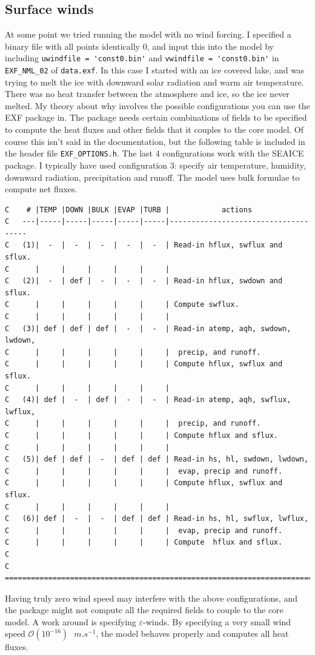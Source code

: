 \documentclass[11pt]{article}
\begin{document}
\subsection{Surface winds}
\label{sec:epsilonWinds}
At some point we tried running the model with no wind forcing. I specified a binary file with all points identically 0, and input this into the model by including \verb|uwindfile = 'const0.bin'| and \verb|vwindfile = 'const0.bin'| in \verb|EXF_NML_02| of \verb|data.exf|. In this case I started with an ice covered lake, and was trying to melt the ice with downward solar radiation and warm air temperature. There was no heat transfer between the atmosphere and ice, so the ice never melted. My theory about why involves the possible configurations you can use the EXF package in. The package needs certain combinations of fields to be specified to compute the heat fluxes and other fields that it couples to the core model. Of course this isn't said in the documentation, but the following table is included in the header file \verb|EXF_OPTIONS.h|. The last 4 configurations work with the SEAICE package. I typically have used configuration 3: specify air temperature, humidity, downward radiation, precipitation and runoff. The model uses bulk formulae to compute net fluxes.

\begin{lstlisting}[caption={Available configurations for running the EXF package}]
C    # |TEMP |DOWN |BULK |EVAP |TURB |            actions
C   ---|-----|-----|-----|-----|-----|-------------------------------------
C   (1)|  -  |  -  |  -  |  -  |  -  | Read-in hflux, swflux and sflux.
C      |     |     |     |     |     |
C   (2)|  -  | def |  -  |  -  |  -  | Read-in hflux, swdown and sflux.
C      |     |     |     |     |     | Compute swflux.
C      |     |     |     |     |     |
C   (3)| def | def | def |  -  |  -  | Read-in atemp, aqh, swdown, lwdown,
C      |     |     |     |     |     |  precip, and runoff.
C      |     |     |     |     |     | Compute hflux, swflux and sflux.
C      |     |     |     |     |     |
C   (4)| def |  -  | def |  -  |  -  | Read-in atemp, aqh, swflux, lwflux,
C      |     |     |     |     |     |  precip, and runoff.
C      |     |     |     |     |     | Compute hflux and sflux.
C      |     |     |     |     |     |
C   (5)| def | def |  -  | def | def | Read-in hs, hl, swdown, lwdown,
C      |     |     |     |     |     |  evap, precip and runoff.
C      |     |     |     |     |     | Compute hflux, swflux and sflux.
C      |     |     |     |     |     |
C   (6)| def |  -  |  -  | def | def | Read-in hs, hl, swflux, lwflux,
C      |     |     |     |     |     |  evap, precip and runoff.
C      |     |     |     |     |     | Compute  hflux and sflux.
C
C   =======================================================================
\end{lstlisting}
Having truly zero wind speed may interfere with the above configurations, and the package might not compute all the required fields to couple to the core model. A work around is specifying $\varepsilon$-winds. By specifying a very small wind speed $\mathcal{O}(10^{-16}) \textrm{ } \si{m.s^{-1}}$, the model behaves properly and computes all heat fluxes.
\end{document}
